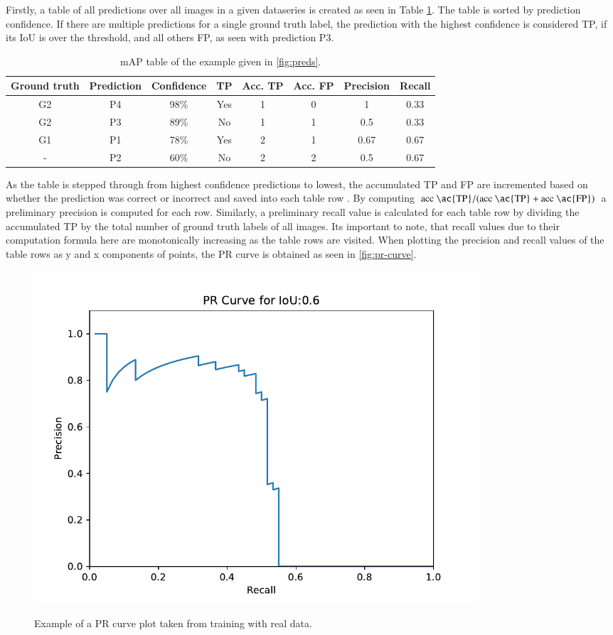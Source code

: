 \documentclass[10pt]{book}
\newcommand{\figureref}[1]{\autoref{#1}}
\begin{document}
Firstly, a table of all predictions over all images in a given dataseries is created as seen in Table \ref{tab:mAP}. The table is sorted by prediction confidence. If there are multiple predictions for a single ground truth label, the prediction with the highest confidence is considered TP, if its \ac{IoU} is over the threshold, and all others FP, as seen with prediction P3. 

\begin{table}
  \begin{tabular}{ c c c c c c c c }
   Ground truth & Prediction & Confidence & TP & Acc. TP & Acc. FP & Precision & Recall \\ 
   \hline
   G2 & P4 & 98\% & Yes & 1 & 0 & 1 & 0.33 \\
   G2 & P3 & 89\% & No & 1 & 1 & 0.5 & 0.33 \\
   G1 & P1 & 78\% & Yes & 2 & 1 & 0.67 & 0.67 \\
   - & P2 & 60\% & No & 2 & 2 & 0.5 & 0.67 \\
   \hline
  \end{tabular}
  \caption{\label{tab:mAP}\ac{mAP} table of the example given in \figureref{fig:preds}.}
\end{table}

As the table is stepped through from highest confidence predictions to lowest, the accumulated \ac{TP} and \ac{FP} are incremented based on whether the prediction was correct or incorrect and saved into each table row \cite{padilla2020survey}. By computing $\text{acc \ac{TP}} / (\text{acc \ac{TP}} + \text{acc \ac{FP}})$ a preliminary precision is computed for each row. Similarly, a preliminary recall value is calculated for each table row by dividing the accumulated \ac{TP} by the total number of ground truth labels of all images. Its important to note, that recall values due to their computation formula here are monotonically increasing as the table rows are visited. When plotting the precision and recall values of the table rows as y and x components of points, the \ac{PR curve} is obtained as seen in \figureref{fig:pr-curve}.

\begin{figure}
  \caption{Example of a \ac{PR curve} plot taken from training with real data.}
  \includegraphics[width=0.8\textwidth]{image/eval_PR_Curve_0.60}
  \label{fig:pr-curve}
\end{figure}
\end{document}
